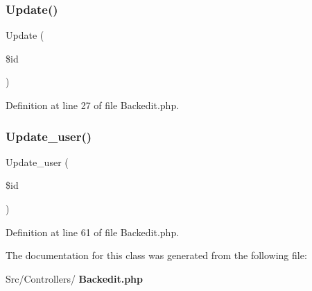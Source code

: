 \subsubsection{Update()}
{\footnotesize\ttfamily Update (\begin{DoxyParamCaption}\item[{}]{\$id }\end{DoxyParamCaption})}



Definition at line 27 of file Backedit.\+php.

\mbox{\label{class_src_1_1_controllers_1_1_backedit_ac76a9db7f422d94f155c99c21540da0e}} 
\subsubsection{Update\+\_\+user()}
{\footnotesize\ttfamily Update\+\_\+user (\begin{DoxyParamCaption}\item[{}]{\$id }\end{DoxyParamCaption})}



Definition at line 61 of file Backedit.\+php.



The documentation for this class was generated from the following file\+:\begin{DoxyCompactItemize}
\item 
Src/\+Controllers/\textbf{ Backedit.\+php}\end{DoxyCompactItemize}
